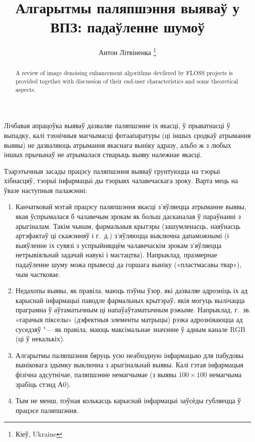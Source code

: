 \documentclass[10pt, a5paper]{article}
\begin{document}
\title{Алгарытмы паляпшэння выяваў у ВПЗ: падаўленне шумоў}
\author{Антон Літвіненка \footnote{Кіеў, Ukraine}}
\maketitle
\begin{abstract}
A review of image denoising enhancement algorithms devilered by FLOSS projects is provided together with discussion of their end-user characteristics and some theoretical aspects.
\end{abstract}
Лічбавая апрацоўка выяваў дазваляе паляпшэнне іх якасці, ў прыватнасці ў выпадку, калі тэхнічныя магчымасці фотаапаратуры (ці іншых сродкаў атрымання выявы) не дазваляюць атрымання якаснага выніку адразу, альбо ж з любых іншых прычынаў не атрымалася стварыць выяву належнае якасці.

Тэарэтычныя засады працэсу паляпшэння выяваў грунтуюцца на тэорыі хібнасцяў, тэорыі інфармацыі ды тэорыях чалавечаскага зроку. Варта мець на ўвазе наступныя палажэнні:

\begin{enumerate}
  \item Канчатковай мэтай працэсу паляпшэння якасці з’яўляецца атрыманне выявы, якая ўспрымалася б чалавечым зрокам як больш дасканалая ў параўнанні з арыгіналам. Такім чынам, фармальныя крытэры (зашумленасць, наяўнасць артэфактаў ці скажэнняў і г.~д.) з’яўляюцца выключна дапаможнымі (і выяўленне іх сувязі з успрыйняццём чалавечаскім зрокам з’яўляецца нетрывіяльнай задачай навукі і мастацтва). Напрыклад, празмернае падаўленне шуму можа прывесці да горшага выніку  («пластмасавы твар»), чым частковае.
  \item Недахопы выявы, як правіла, маюць пэўны ўзор, які дазваляе адрозніць іх ад карыснай інфармацыі паводле фармальных крытэраў, якія могуць вылічацца праграмна ў аўтаматычным ці напаўаўтаматычным рэжыме. Напрыклад, г.~зв. «гарачыя пікселы» (дэфектныя элементы матрыцы) рэзка адрозніваюцца ад суседзяў "--- як правіла, маюць максімальнае значэнне ў адным канале RGB (ці ў некалькіх).
  \item Алгарытмы паляпшэння бяруць усю неабходную інфармацыю для пабудовы выніковага здымку выключна з арыгінальнай выявы. Калі гэтая інфармацыя фізічна адсутнічае, паляпшэнне немагчымае (з выявы $100\times100$ немагчыма зрабіць стэнд А0).
  \item Тым не менш, пэўная колькасць карыснай інфармацыі заўсёды губляецца ў працэсе паляпшэння.
\end{enumerate}
\end{document}
